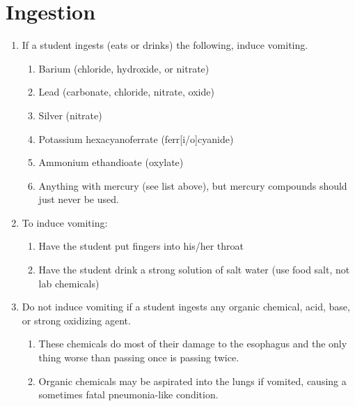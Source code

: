 \section{Ingestion}
\begin{enumerate}

\item{If a student ingests (eats or drinks) the following, induce vomiting.}
\begin{enumerate}
\item{Barium (chloride, hydroxide, or nitrate)}
\item{Lead (carbonate, chloride, nitrate, oxide)}
\item{Silver (nitrate)}
\item{Potassium hexacyanoferrate (ferr[i/o]cyanide)}
\item{Ammonium ethandioate (oxylate)}
\item{Anything with mercury (see list above), 
but mercury compounds should just never be used.}
\end{enumerate}

\item{To induce vomiting:}
\begin{enumerate}
\item{Have the student put fingers into his/her throat}
\item{Have the student drink a strong solution of salt water 
(use food salt, not lab chemicals)}
\end{enumerate}

\item{Do not induce vomiting if a student ingests any organic chemical, 
acid, base, or strong oxidizing agent.}
\begin{enumerate}
\item{These chemicals do most of their damage to the esophagus 
and the only thing worse than passing once is passing twice.}
\item{Organic chemicals may be aspirated into the lungs if vomited, 
causing a sometimes fatal pneumonia-like condition.}
\end{enumerate}

\end{enumerate}

